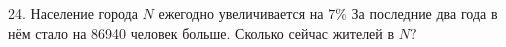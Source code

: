 24. Население города $N$ ежегодно увеличивается на $7\%$ За последние два года в нём стало на 86940 человек больше. Сколько сейчас жителей в $N?$\\
